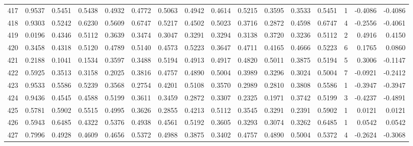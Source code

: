 \begin{tabular}{lrrrrrrrrrrrrrrr}
417 &      0.9537 &  0.5451 &  0.5438 &  0.4932 &  0.4772 &  0.5063 &  0.4942 &  0.4614 &  0.5215 &  0.3595 &   0.3533 &     0.5451 &      1 &                   -0.4086 &                    -0.4086 \\
418 &      0.9303 &  0.5242 &  0.6230 &  0.5609 &  0.6747 &  0.5217 &  0.4502 &  0.5023 &  0.3716 &  0.2872 &   0.4598 &     0.6747 &      4 &                   -0.2556 &                    -0.4061 \\
419 &      0.0196 &  0.4346 &  0.5112 &  0.3639 &  0.3474 &  0.3047 &  0.3291 &  0.3294 &  0.3138 &  0.3720 &   0.3236 &     0.5112 &      2 &                    0.4916 &                     0.4150 \\
420 &      0.3458 &  0.4318 &  0.5120 &  0.4789 &  0.5140 &  0.4573 &  0.5223 &  0.3647 &  0.4711 &  0.4165 &   0.4666 &     0.5223 &      6 &                    0.1765 &                     0.0860 \\
421 &      0.2188 &  0.1041 &  0.1534 &  0.3597 &  0.3488 &  0.5194 &  0.4913 &  0.4917 &  0.4820 &  0.5011 &   0.3875 &     0.5194 &      5 &                    0.3006 &                    -0.1147 \\
422 &      0.5925 &  0.3513 &  0.3158 &  0.2025 &  0.3816 &  0.4757 &  0.4890 &  0.5004 &  0.3989 &  0.3296 &   0.3024 &     0.5004 &      7 &                   -0.0921 &                    -0.2412 \\
423 &      0.9533 &  0.5586 &  0.5239 &  0.3568 &  0.2754 &  0.4201 &  0.5108 &  0.3570 &  0.2989 &  0.2810 &   0.3808 &     0.5586 &      1 &                   -0.3947 &                    -0.3947 \\
424 &      0.9436 &  0.4545 &  0.4588 &  0.5199 &  0.3611 &  0.3459 &  0.2872 &  0.3307 &  0.2325 &  0.1971 &   0.3742 &     0.5199 &      3 &                   -0.4237 &                    -0.4891 \\
425 &      0.5781 &  0.5902 &  0.5515 &  0.4995 &  0.3626 &  0.2855 &  0.4213 &  0.5112 &  0.3545 &  0.3291 &   0.2391 &     0.5902 &      1 &                    0.0121 &                     0.0121 \\
426 &      0.5943 &  0.6485 &  0.4322 &  0.5376 &  0.4938 &  0.4561 &  0.5192 &  0.3605 &  0.3293 &  0.3074 &   0.3262 &     0.6485 &      1 &                    0.0542 &                     0.0542 \\
427 &      0.7996 &  0.4928 &  0.4609 &  0.4656 &  0.5372 &  0.4988 &  0.3875 &  0.3402 &  0.4757 &  0.4890 &   0.5004 &     0.5372 &      4 &                   -0.2624 &                    -0.3068 \\

\end{tabular}
